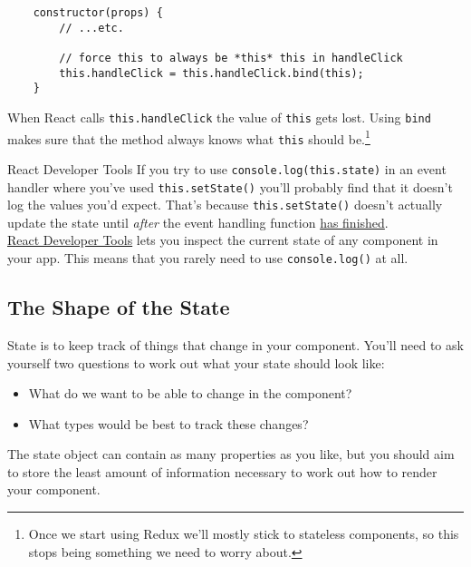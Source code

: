 \begin{verbatim}
    constructor(props) {
        // ...etc.

        // force this to always be *this* this in handleClick
        this.handleClick = this.handleClick.bind(this);
    }
\end{verbatim}

 When React calls \texttt{this.handleClick} the value of \texttt{this} gets lost. Using \texttt{bind} makes sure that the method always knows what \texttt{this} should be.\footnote{Once we start using Redux we'll mostly stick to stateless components, so this stops being something we need to worry about.}



\begin{infobox}{React Developer Tools}
    If you try to use \texttt{console.log(this.state)} in an event handler where you've used \texttt{this.setState()} you'll probably find that it doesn't log the values you'd expect. That's because \texttt{this.setState()} doesn't actually update the state until \textit{after} the event handling function \href{https://medium.com/@baphemot/understanding-reactjs-setstate-a4640451865b}{has finished}.
    \\

    \href{https://github.com/facebook/react-devtools}{React Developer Tools} lets you inspect the current state of any component in your app. This means that you rarely need to use \texttt{console.log()} at all.
\end{infobox}



\subsection{The Shape of the State}

State is to keep track of things that change in your component. You'll need to ask yourself two questions to work out what your state should look like:

\begin{itemize}
    \item What do we want to be able to change in the component?
    \item What types would be best to track these changes?
\end{itemize}

The state object can contain as many properties as you like, but you should aim to store the least amount of information necessary to work out how to render your component.
\\

